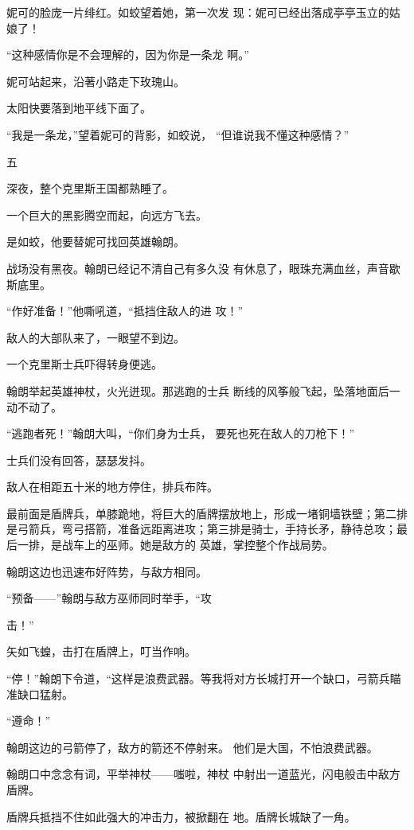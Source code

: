 \documentclass{article}
\begin{document}
妮可的脸庞一片绯红。如蛟望着她，第一次发
现：妮可已经出落成亭亭玉立的姑娘了！ 

“这种感情你是不会理解的，因为你是一条龙
啊。” 


妮可站起来，沿著小路走下玫瑰山。 


\newpage

太阳快要落到地平线下面了。 

“我是一条龙，”望着妮可的背影，如蛟说，
“但谁说我不懂这种感情？” 


五 


深夜，整个克里斯王国都熟睡了。 


一个巨大的黑影腾空而起，向远方飞去。 


是如蛟，他要替妮可找回英雄翰朗。 

战场没有黑夜。翰朗已经记不清自己有多久没
有休息了，眼珠充满血丝，声音歇斯底里。 

“作好准备！”他嘶吼道，“抵挡住敌人的进
攻！” 


敌人的大部队来了，一眼望不到边。 


\newpage

一个克里斯士兵吓得转身便逃。 

翰朗举起英雄神杖，火光迸现。那逃跑的士兵
断线的风筝般飞起，坠落地面后一动不动了。 

“逃跑者死！”翰朗大叫，“你们身为士兵，
要死也死在敌人的刀枪下！” 


士兵们没有回答，瑟瑟发抖。 


敌人在相距五十米的地方停住，排兵布阵。 

最前面是盾牌兵，单膝跪地，将巨大的盾牌摆放地上，形成一堵铜墙铁壁；第二排是弓箭兵，弯弓搭箭，准备远距离进攻；第三排是骑士，手持长矛，静待总攻；最后一排，是战车上的巫师。她是敌方的
英雄，掌控整个作战局势。 


翰朗这边也迅速布好阵势，与敌方相同。 

“预备——”翰朗与敌方巫师同时举手，“攻

\newpage
击！” 


矢如飞蝗，击打在盾牌上，叮当作响。 

“停！”翰朗下令道，“这样是浪费武器。等我将对方长城打开一个缺口，弓箭兵瞄准缺口猛射。


“遵命！” 

翰朗这边的弓箭停了，敌方的箭还不停射来。
他们是大国，不怕浪费武器。 

翰朗口中念念有词，平举神杖——嗤啦，神杖
中射出一道蓝光，闪电般击中敌方盾牌。 

盾牌兵抵挡不住如此强大的冲击力，被掀翻在
地。盾牌长城缺了一角。 
\end{document}
